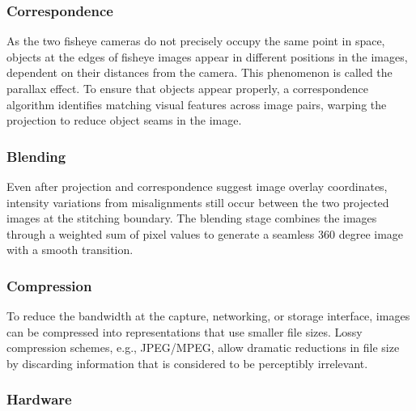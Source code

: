 \subsubsection{Correspondence}  As the two fisheye cameras do not precisely occupy the same point in space, objects at the edges of fisheye images appear in different positions in the images, dependent on their distances from the camera. This phenomenon is called the parallax effect. To ensure that objects appear properly, a correspondence algorithm identifies matching visual features across image pairs, warping the projection to reduce object seams in the image.
\subsubsection{Blending}  Even after projection and correspondence suggest image overlay coordinates, intensity variations from misalignments still occur between the two projected images at the stitching boundary. The blending stage combines the images through a weighted sum of pixel values to generate a seamless 360 \text degree   image with a smooth transition.	
\subsubsection{Compression}  To reduce the bandwidth at the capture, networking, or storage interface, images can be compressed into representations that use smaller file sizes. Lossy compression schemes, e.g., JPEG/MPEG, allow dramatic reductions in file size by discarding information that is considered to be perceptibly irrelevant.
\subsubsection{Hardware}


